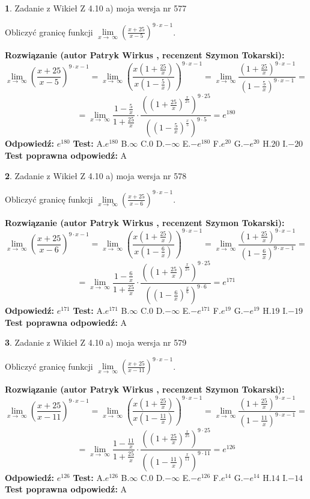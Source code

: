 \documentclass[12pt, a4paper]{article}
\theoremstyle{definition} %
\newtheorem{zad}{}
\newcommand{\zadStart}[1]{\begin{zad}#1\newline}
\newcommand{\zadStop}{\end{zad}}
\newcommand{\rozwStart}[2]{\noindent \textbf{Rozwiązanie (autor #1 , recenzent #2): }\newline}
\newcommand{\rozwStop}{\newline}
\newcommand{\odpStart}{\noindent \textbf{Odpowiedź:}\newline}
\newcommand{\odpStop}{\newline}
\newcommand{\testStart}{\noindent \textbf{Test:}\newline}
\newcommand{\testStop}{\newline}
\newcommand{\kluczStart}{\noindent \textbf{Test poprawna odpowiedź:}\newline}
\newcommand{\kluczStop}{\newline}
\begin{document}
\zadStart{Zadanie z Wikieł Z 4.10 a) moja wersja nr 577}

Obliczyć granicę funkcji  $\lim\limits_{x\to\ \infty}(\frac{x+25}{x-5})^{9\cdot x-1}$.
\zadStop
\rozwStart{Patryk Wirkus}{Szymon Tokarski}
$$\lim\limits_{x\to\ \infty}(\frac{x+25}{x-5})^{9\cdot x-1} = \lim\limits_{x\to\ \infty}(\frac{x(1+\frac{25}{x})}{x(1-\frac{5}{x})})^{9\cdot x-1}=\lim\limits_{x\to\ \infty}\frac{(1+\frac{25}{x})^{9\cdot x-1}}{(1-\frac{5}{x})^{9\cdot x-1}}=$$
$$=\lim\limits_{x\to\ \infty}\frac{1-\frac{5}{x}}{1+\frac{25}{x}}\cdot\frac{((1+\frac{25}{x})^{\frac{x}{25}})^{9\cdot25}}{((1-\frac{5}{x})^{\frac{x}{5}})^{9\cdot5}}=e^{180}$$
\rozwStop
\odpStart
$e^{180}$
\odpStop
\testStart
A.$e^{180}$ B.$\infty$ C.$0$ D.$-\infty$ E.$-e^{180}$
F.$e^{20}$ G.$-e^{20}$
H.$20$
I.$-20$
\testStop
\kluczStart
A
\kluczStop



\zadStart{Zadanie z Wikieł Z 4.10 a) moja wersja nr 578}

Obliczyć granicę funkcji  $\lim\limits_{x\to\ \infty}(\frac{x+25}{x-6})^{9\cdot x-1}$.
\zadStop
\rozwStart{Patryk Wirkus}{Szymon Tokarski}
$$\lim\limits_{x\to\ \infty}(\frac{x+25}{x-6})^{9\cdot x-1} = \lim\limits_{x\to\ \infty}(\frac{x(1+\frac{25}{x})}{x(1-\frac{6}{x})})^{9\cdot x-1}=\lim\limits_{x\to\ \infty}\frac{(1+\frac{25}{x})^{9\cdot x-1}}{(1-\frac{6}{x})^{9\cdot x-1}}=$$
$$=\lim\limits_{x\to\ \infty}\frac{1-\frac{6}{x}}{1+\frac{25}{x}}\cdot\frac{((1+\frac{25}{x})^{\frac{x}{25}})^{9\cdot25}}{((1-\frac{6}{x})^{\frac{x}{6}})^{9\cdot6}}=e^{171}$$
\rozwStop
\odpStart
$e^{171}$
\odpStop
\testStart
A.$e^{171}$ B.$\infty$ C.$0$ D.$-\infty$ E.$-e^{171}$
F.$e^{19}$ G.$-e^{19}$
H.$19$
I.$-19$
\testStop
\kluczStart
A
\kluczStop



\zadStart{Zadanie z Wikieł Z 4.10 a) moja wersja nr 579}

Obliczyć granicę funkcji  $\lim\limits_{x\to\ \infty}(\frac{x+25}{x-11})^{9\cdot x-1}$.
\zadStop
\rozwStart{Patryk Wirkus}{Szymon Tokarski}
$$\lim\limits_{x\to\ \infty}(\frac{x+25}{x-11})^{9\cdot x-1} = \lim\limits_{x\to\ \infty}(\frac{x(1+\frac{25}{x})}{x(1-\frac{11}{x})})^{9\cdot x-1}=\lim\limits_{x\to\ \infty}\frac{(1+\frac{25}{x})^{9\cdot x-1}}{(1-\frac{11}{x})^{9\cdot x-1}}=$$
$$=\lim\limits_{x\to\ \infty}\frac{1-\frac{11}{x}}{1+\frac{25}{x}}\cdot\frac{((1+\frac{25}{x})^{\frac{x}{25}})^{9\cdot25}}{((1-\frac{11}{x})^{\frac{x}{11}})^{9\cdot11}}=e^{126}$$
\rozwStop
\odpStart
$e^{126}$
\odpStop
\testStart
A.$e^{126}$ B.$\infty$ C.$0$ D.$-\infty$ E.$-e^{126}$
F.$e^{14}$ G.$-e^{14}$
H.$14$
I.$-14$
\testStop
\kluczStart
A
\kluczStop
\end{document}
